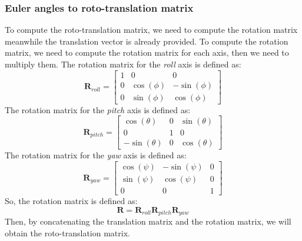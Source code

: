 \subsubsection*{Euler angles to roto-translation matrix}
To compute the roto-translation matrix, we need to compute the rotation matrix meanwhile the translation vector is already provided.
To compute the rotation matrix, we need to compute the rotation matrix for each axis, then we need to multiply them.
The rotation matrix for the \textit{roll} axis is defined as:
\begin{equation}
    \textbf{R}_{roll} = \begin{bmatrix}
                     1 & 0 & 0 \\
                     0 & \cos(\phi) & -\sin(\phi) \\
                     0 & \sin(\phi) & \cos(\phi)
    \end{bmatrix}
    \label{eq:rotation_matrix_roll}
\end{equation}
The rotation matrix for the \textit{pitch} axis is defined as:
\begin{equation}
    \textbf{R}_{pitch} = \begin{bmatrix}
                     \cos(\theta) & 0 & \sin(\theta) \\
                     0 & 1 & 0 \\
                     -\sin(\theta) & 0 & \cos(\theta)
    \end{bmatrix}
    \label{eq:rotation_matrix_pitch}
\end{equation}
The rotation matrix for the \textit{yaw} axis is defined as:
\begin{equation}
    \textbf{R}_{yaw} = \begin{bmatrix}
                     \cos(\psi) & -\sin(\psi) & 0 \\
                     \sin(\psi) & \cos(\psi) & 0 \\
                     0 & 0 & 1
    \end{bmatrix}
    \label{eq:rotation_matrix_yaw}
\end{equation}
So, the rotation matrix is defined as:
\begin{equation}
    \textbf{R} = \textbf{R}_{roll} \textbf{R}_{pitch} \textbf{R}_{yaw}
    \label{eq:eq-rotation_matrix}
\end{equation}
Then, by concatenating the translation matrix and the rotation matrix, we will obtain the roto-translation matrix.

